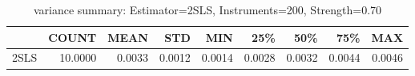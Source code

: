 \begin{table}[ht]
\centering
\caption{variance summary: Estimator=2SLS, Instruments=200, Strength=0.70}
\begin{tabular}{lrrrrrrrr}
\toprule
 & COUNT & MEAN & STD & MIN & 25\% & 50\% & 75\% & MAX \\
\midrule
2SLS & 10.0000 & 0.0033 & 0.0012 & 0.0014 & 0.0028 & 0.0032 & 0.0044 & 0.0046 \\
\bottomrule
\end{tabular}
\end{table}
